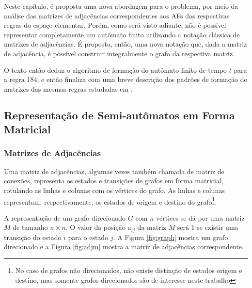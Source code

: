 \documentclass[12pt,a4paper]{article}
\begin{document}
Neste capítulo, é proposta uma nova abordagem para o problema, por meio da
análise das matrizes de adjacências correspondentes aos AFs
das respectivas regras do espaço elementar. Porém, como será visto adiante,
não é possível representar completamente um autômato finito utilizando a
notação clássica de matrizes de adjacências. É proposta, então, uma
nova notação que, dada a matriz de adjacência, é possível construir
integralmente o grafo da respectiva matriz.

O texto então deduz o algoritmo de formação do autômato finito
de tempo $t$ para a regra 184; e então finaliza com uma breve
descrição dos padrões de formação de matrizes das mesmas regras
estudadas em .

\subsection{Representação de Semi-autômatos em Forma Matricial}

\subsubsection{Matrizes de Adjacências}

Uma matriz de adjacências, algumas vezes também chamada de matriz de
conexões, representa os estados e transições de grafos em forma matricial,
rotulando as linhas e colunas com os vértices do grafo. As linhas e
colunas representam, respectivamente, os estados de origem e destino
do grafo\footnote{No caso de grafos não direcionados, não existe
distinção de estados origem e destino, mas somente grafos direcionados são 
de interesse neste trabalho}.

A representação de um grafo direcionado $G$ com $n$ vértices se dá por uma
matriz $M$ de tamanho $n \times n$. O valor da posição $a_{ij}$ da matriz
$M$ será $1$ se existir uma transição do estado $i$ para o estado $j$.
A Figura \ref{fig:graph} mostra um grafo direcionado e a Figura \ref{fig:adjm}
mostra a matriz de adjacências correspondente.
\end{document}
